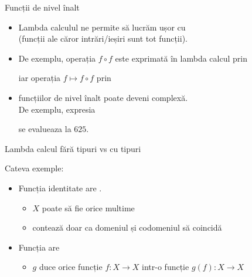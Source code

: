 \documentclass[xcolor=pdftex,romanian,colorlinks]{beamer}
\begin{document}
\begin{frame}{Funcții de nivel înalt}

\begin{itemize}
\item Lambda calculul ne permite să lucrăm ușor cu  \\(funcții ale căror intrări/ieșiri sunt tot funcții).

\medskip
\item De exemplu, operația $f \circ f$ este exprimată în lambda calcul prin
\begin{center}
\end{center}
iar operația $f \mapsto f \circ f$ prin
\begin{center}
\end{center}

\medskip
\item {} funcțiilor de nivel înalt poate deveni complexă. \\De exemplu, expresia
\begin{center}
\end{center}
se evalueaza la $625$.
\end{itemize}
\end{frame}

\begin{frame}{Lambda calcul fără tipuri vs cu tipuri}


\hspace{-.5cm} Cateva exemple:


\begin{itemize}
\item Funcția identitate  are  .
\begin{itemize}
	\item $X$ poate să fie orice multime
	\item contează doar ca domeniul și codomeniul să coincidă
\end{itemize}

\medskip
\item Funcția  are  
\begin{itemize}
	\item $g$ duce orice funcție $f : X \to X$ intr-o funcție $g(f) : X \to X$
\end{itemize}
\end{itemize}

\end{frame}
\end{document}
